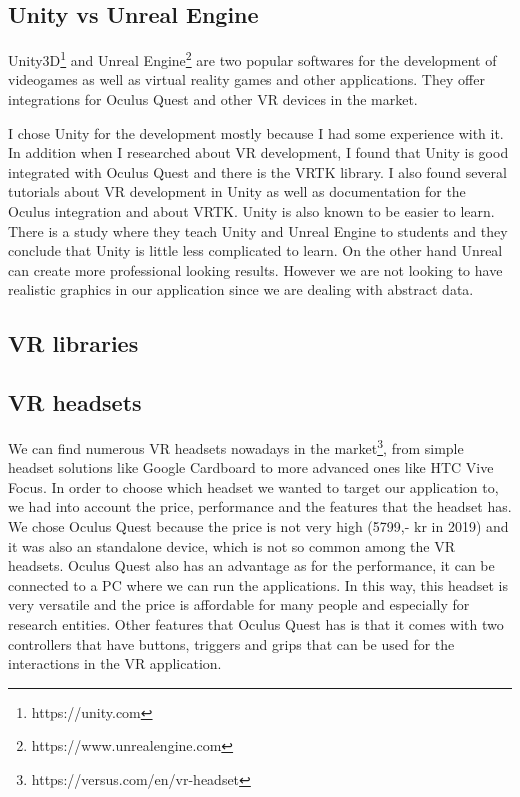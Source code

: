 \subsection{Unity vs Unreal Engine}
Unity3D\footnote{https://unity.com} and Unreal Engine\footnote{https://www.unrealengine.com} are two popular softwares for the development of videogames as well as virtual reality games and other applications. They offer integrations for Oculus Quest and other VR devices in the market.

I chose Unity for the development mostly because I had some experience with it. In addition when I researched about VR development, I found that Unity is good integrated with Oculus Quest and there is the VRTK library. I also found several tutorials about VR development in Unity as well as documentation for the Oculus integration and about VRTK. Unity is also known to be easier to learn. There is a study where they teach Unity and Unreal Engine to students and they conclude that Unity is little less complicated to learn\cite{unity_vs_unreal}. On the other hand Unreal can create more professional looking results. However we are not looking to have realistic graphics in our application since we are dealing with abstract data.

\subsection{VR libraries}

\subsection{VR headsets}
We can find numerous VR headsets nowadays in the market\footnote{https://versus.com/en/vr-headset}, from simple headset solutions like Google Cardboard to more advanced ones like HTC Vive Focus. In order to choose which headset we wanted to target our application to, we had into account the price, performance and the features that the headset has. We chose Oculus Quest because the price is not very high (5799,- kr in 2019) and it was also an standalone device, which is not so common among the VR headsets. Oculus Quest also has an advantage as for the performance, it can be connected to a PC where we can run the applications. In this way, this headset is very versatile and the price is affordable for many people and especially for research entities. Other features that Oculus Quest has is that it comes with two controllers that have buttons, triggers and grips that can be used for the interactions in the VR application.
